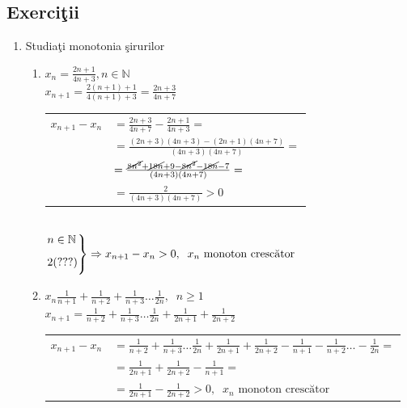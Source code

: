 \documentclass[a4paper, 12pt, notitlepage]{book}
\begin{document}
    \subsection{Exerci\c{t}ii}
    \begin{enumerate}
      \item Studia\c{t}i monotonia \c{s}irurilor
            \begin{enumerate}[\quad a.]
              \item $x_{n} = \frac{2n+1}{4n+3}, n \in \mathbb{N}$\\[5pt]
                    $x_{n+1} = \frac{2(n+1) + 1}{4(n+1) +3} = \frac{2n+3}{4n+7}$\\[5pt]
                    \begin{tabular}{ll}
                      $x_{n+1} - x_{n}$ & $= \frac{2n+3}{4n+7} - \frac{2n+1}{4n+3} =$\\[5pt]
                                     & $= \frac{(2n+3)(4n+3)-(2n+1)(4n+7)}{(4n+3)(4n+7)}=$\\[5pt]
                                     & $= \frac{\cancel{8n^{2}} + \cancel{18n} + 9 - \cancel{8n^{2}} - \cancel{18n} - 7}{(4n+3)(4n+7)}=$\\[5pt]
                                     & $= \frac{2}{(4n+3)(4n+7)} > 0$
                    \end{tabular}\\[5pt]
                    \begin{math}
                      \begin{rcases}
                        n \in \mathbb{N}\\[5pt]
                        2 (???)\\[5pt]
                      \end{rcases}
                      \Rightarrow x_{n+1} - x_{n} > 0, \;\; x_{n} \text{ monoton cresc\u{a}tor}
                    \end{math}

              \item $x_{n} \frac{1}{n+1} + \frac{1}{n+2} + \frac{1}{n+3} \ldots \frac{1}{2n},\;\; n \ge 1$\\[5pt]
                    $x_{n+1} = \frac{1}{n+2} + \frac{1}{n+3} \ldots \frac{1}{2n} + \frac{1}{2n+1} + \frac{1}{2n+2}$\\[5pt]
                    \begin{tabular}{ll}
                    $x_{n+1} - x_{n}$ & $= \frac{1}{n+2} + \frac{1}{n+3} \ldots \frac{1}{2n} + \frac{1}{2n+1} + \frac{1}{2n+2} - \frac{1}{n+1} - \frac{1}{n+2} \ldots - \frac{1}{2n}=$\\[5pt]
                                      & $= \frac{1}{2n+1} + \frac{1}{2n+2} - \frac{1}{n+1} =$\\[5pt]
                                      & $= \frac{1}{2n+1} - \frac{1}{2n+2} > 0,\;\; x_{n} \text{ monoton cresc\u{a}tor}$
                    \end{tabular}


\end{enumerate}
\end{enumerate}
\end{document}
